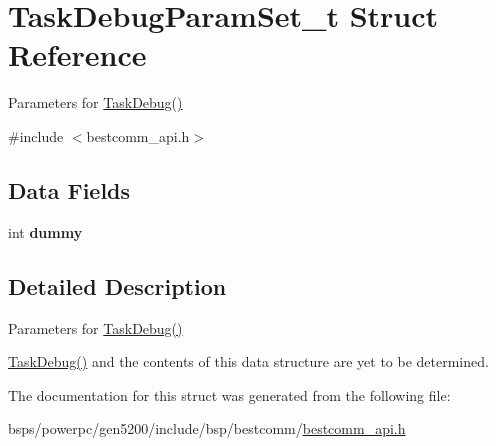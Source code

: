 \hypertarget{structTaskDebugParamSet__t}{}\section{Task\+Debug\+Param\+Set\+\_\+t Struct Reference}
\label{structTaskDebugParamSet__t}


Parameters for \mbox{\hyperlink{bestcomm__api_8c_a455957c637fde5586390764bbc17cbfd}{Task\+Debug()}}  




{\ttfamily \#include $<$bestcomm\+\_\+api.\+h$>$}

\subsection*{Data Fields}
\begin{DoxyCompactItemize}
\item 
\mbox{\label{structTaskDebugParamSet__t_afc156cb33f65b99245f0592bed358f0a}} 
int {\bfseries dummy}
\end{DoxyCompactItemize}


\subsection{Detailed Description}
Parameters for \mbox{\hyperlink{bestcomm__api_8c_a455957c637fde5586390764bbc17cbfd}{Task\+Debug()}} 

\mbox{\hyperlink{bestcomm__api_8c_a455957c637fde5586390764bbc17cbfd}{Task\+Debug()}} and the contents of this data structure are yet to be determined. 

The documentation for this struct was generated from the following file\+:\begin{DoxyCompactItemize}
\item 
bsps/powerpc/gen5200/include/bsp/bestcomm/\mbox{\hyperlink{bestcomm__api_8h}{bestcomm\+\_\+api.\+h}}\end{DoxyCompactItemize}
